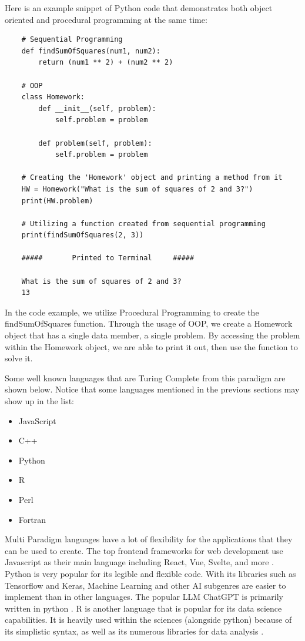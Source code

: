 Here is an example snippet of Python code that demonstrates both object oriented and procedural programming at the same time:

\begin{verbatim}
    # Sequential Programming
    def findSumOfSquares(num1, num2):
        return (num1 ** 2) + (num2 ** 2)

    # OOP
    class Homework:
        def __init__(self, problem):
            self.problem = problem
            
        def problem(self, problem):
            self.problem = problem

    # Creating the 'Homework' object and printing a method from it
    HW = Homework("What is the sum of squares of 2 and 3?")
    print(HW.problem)

    # Utilizing a function created from sequential programming
    print(findSumOfSquares(2, 3))

    #####       Printed to Terminal     #####

    What is the sum of squares of 2 and 3?
    13
\end{verbatim}

In the code example, we utilize Procedural Programming to create the findSumOfSquares function.
Through the usage of OOP, we create a Homework object that has a single data member, a single problem.
By accessing the problem within the Homework object, we are able to print it out, then use the function to solve it.

Some well known languages that are Turing Complete from this paradigm are shown below.
Notice that some languages mentioned in the previous sections may show up in the list: 
\begin{itemize}
    \item JavaScript
    \item C++
    \item Python
    \item R
    \item Perl
    \item Fortran
\end{itemize}

Multi Paradigm languages have a lot of flexibility for the applications that they can be used to create.
The top frontend frameworks for web development use Javascript as their main language including React, Vue, Svelte, and more \cite{JSPopular}.
Python is very popular for its legible and flexible code.
With its libraries such as Tensorflow and Keras, Machine Learning and other AI subgenres are easier to implement than in other languages.
The popular LLM ChatGPT is primarily written in python \cite{ChatGPTPython}.
R is another language that is popular for its data science capabilities.
It is heavily used within the sciences (alongside python) because of its simplistic syntax, as well as its numerous libraries for data analysis \cite{RDataSci,DataSciLangs}.

